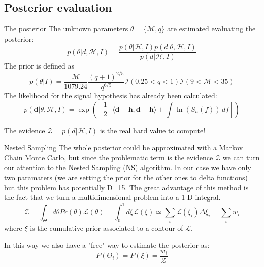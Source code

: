 \documentclass[
10pt,
aspectratio=169,
]{beamer}
\begin{document}
\subsection{Posterior evaluation}
\begin{frame}{The posterior}
    The unknown parameters $\theta=\{\mathcal{M},q\}$ are estimated evaluating the posterior:
\begin{equation}
    p(\theta|d, \mathcal{H}, I) = \frac{p(\theta|\mathcal{H}, I)p(d|\theta, \mathcal{H}, I)}{p(d|\mathcal{H}, I)}
\end{equation}
The prior is defined as
\begin{equation}
     p(\theta|I) = \frac{\mathcal{M}}{1079.24}\frac{(q+1)^{2/5}}{q^{6/5}}\mathcal{I}(0.25<q<1)\mathcal{I}(9<\mathcal{M}<35)
 \end{equation}
The likelihood for the signal hypothesis has already been calculated:
\begin{equation}
    p(\boldsymbol{d}|\theta, \mathcal{H}, I) = \exp\left(-\frac{1}{2} \left[ \langle \boldsymbol{d} - \boldsymbol{h}, \boldsymbol{d} -\boldsymbol{h} \rangle + \int\ln(S_n(f)) \, df \right] \right)
\end{equation}

The evidence $\mathcal{Z}=p(d|\mathcal{H}, I)$ is the real hard value to compute!
\end{frame}
\begin{frame}{Nested Sampling}
    The whole posterior could be approximated with a Markov Chain Monte Carlo, but since the problematic term is the evidence $\mathcal{Z}$ we can turn our attention to the Nested Sampling (NS) algorithm. 
\vfill
In our case we have only two paramaters (we are setting the prior for the other ones to delta functions) but this problem has potentially D=15.
    \vfill
    The great advantage of this method is the fact that we turn a multidimensional problem into a 1-D integral.
        \begin{equation}
        \mathcal{Z}=\int_\Theta d\theta Pr(\theta) \mathcal{L}(\theta) = \int_0^1d\xi\mathcal{L}(\xi)\simeq \sum_i \mathcal{L}(\xi_i)\Delta \xi_i = \sum_i w_i
    \end{equation}
    where $\xi$ is the cumulative prior associated to a contour of $\mathcal{L}$. 

    In this way we also have a "free" way to estimate the posterior as:
    \begin{equation}
        P(\Theta_i) = P(\xi) = \frac{w_i}{\mathcal{Z}}
    \end{equation}
\end{frame}
\end{document}
